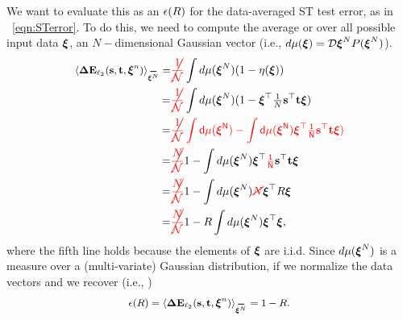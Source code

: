 We want to evaluate this as an \EffectivePotential $\epsilon(R)$ for the data-averaged ST test error, as in \EQN~\ref{eqn:STerror}.
To do this, we need to compute the average or \ExpectedValue over all possible input data $\boldsymbol{\xi}$,
an $N-$dimensional Gaussian vector (i.e., $d\mu(\boldsymbol{\xi})=\mathcal{D}\boldsymbol{\xi}^{N} P(\boldsymbol{\xi}^{N})$).
%
\begin{align}
 \langle\DETOPSTLL\rangle_{\AVGNDXI}  
   = &\red{\cancel{\frac{1}{\mathcal{N}}}}\int d\mu(\NDXI)(1-\ETA(\XI)) \\ \nonumber
   = &\red{\cancel{\frac{1}{\mathcal{N}}}}\int d\mu(\NDXI)(1-\XI^{\top}\tfrac{1}{N}\SVEC^{\top}\TVEC\XI) \\ \label{eqn:XI_ST} 
   = &\red{\cancel{\frac{1}{\mathcal{N}}}\int d\mu(\NDXI)-\int d\mu(\NDXI)\XI^{\top}\tfrac{1}{N}\SVEC^{\top}\TVEC\XI) } \\ \nonumber
   = & \red{\cancel{\frac{N}{\mathcal{N}}}}1 - \int d\mu(\NDXI)\XI^{\top}\red{\tfrac{1}{N}}\SVEC^{\top}\TVEC\XI \\ \nonumber
   = & \red{\cancel{\frac{N}{\mathcal{N}}}}1 - \int d\mu(\NDXI)\red{\cancel{N}}\XI^{\top} R\XI \\ \nonumber
   = & \red{\cancel{\frac{N}{\mathcal{N}}}}1 - R\int d\mu(\NDXI)\XI^{\top}\XI,
\end{align}
where the fifth line holds because the elements of $\boldsymbol{\xi}$ are i.i.d.
Since $d\mu(\boldsymbol{\xi}^{N})$ is a measure over a (multi-variate) Gaussian distribution,
if we normalize the data vectors  and we recover (i.e., \red{\EQN~\ref{eqn:epsl}})
\begin{align}
\label{eqn:e0}
\EPSL(R)=\langle\DETOPSTLL\rangle_{\AVGNDXI} =  1 - R .
\end{align}
